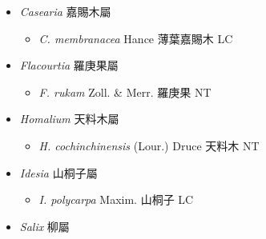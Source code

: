 
  \begin{itemize}
 \item[] \textit{Casearia} 嘉賜木屬
                                
  \begin{itemize}
        \item[] \textit{C. membranacea} Hance  薄葉嘉賜木   LC
  \end{itemize}
 \item[] \textit{Flacourtia} 羅庚果屬
                                
  \begin{itemize}
        \item[] \textit{F. rukam} Zoll. \& Merr.  羅庚果   NT
  \end{itemize}
 \item[] \textit{Homalium} 天料木屬
                                
  \begin{itemize}
        \item[] \textit{H. cochinchinensis} (Lour.) Druce  天料木   NT
  \end{itemize}
 \item[] \textit{Idesia} 山桐子屬
                                
  \begin{itemize}
        \item[] \textit{I. polycarpa} Maxim.  山桐子   LC
  \end{itemize}
 \item[] \textit{Salix} 柳屬
                                

\end{itemize}
